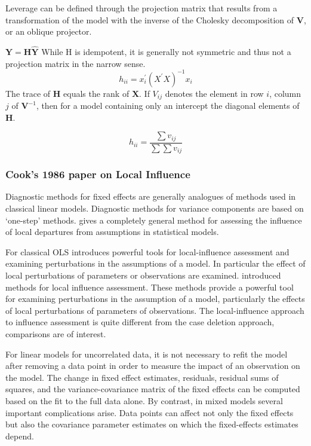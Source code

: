\documentclass[12pt, a4paper]{report}
\theoremstyle{plain}
\theoremstyle{definition}
\theoremstyle{remark}
\begin{document}
	
	Leverage can be defined through the projection matrix that results from a transformation of the model with the inverse of the Cholesky decomposition of $\boldsymbol{V}$, or an oblique projector.
	
	$\boldsymbol{Y} = \boldsymbol{H}\boldsymbol{\hat{Y}}$
	While H is idempotent, it is generally not symmetric and thus not a projection matrix in the narrow sense.
	\[ h_{ii} = x^{\prime}_{i}(X^{\prime}X)^{-1}x_{i} \]
	The trace of $\boldsymbol{H}$ equals the rank of $\boldsymbol{X}$.
	If $V_{ij}$ denotes the element in row $i$, column $j$ of $\boldsymbol{V}^{-1}$, then for a model containing only an intercept the diagonal elements of $\boldsymbol{H}$.
	
	\[ h_{ii} = \frac{\sum v_{ij}}{\sum \sum v_{ij}} \]
	
	
	
	


	\subsubsection{Cook's 1986 paper on Local Influence}%
	
	
	
	Diagnostic methods for fixed effects are generally analogues of methods used in classical linear models.
	Diagnostic methods for variance components are based on `one-step' methods. \citet{cook86} gives a completely general method for assessing the influence of local departures from assumptions in statistical models. 
	
	

		

		
	For classical OLS \citet{cook86} introduces powerful tools for local-influence assessment and examining perturbations in the assumptions of a model. In particular the effect of local perturbations of parameters or observations are examined.
			\citet{cook86} introduced methods for local influence assessment. These methods provide a powerful tool for examining perturbations in the assumption of a model, particularly the effects of local perturbations of parameters of observations. The local-influence approach to influence assessment is quite different from the case deletion approach, comparisons are of interest.

	For linear models for uncorrelated data, it is not necessary to refit the model after removing a data point in order to measure the impact of an observation on the model. The change in fixed effect estimates, residuals, residual sums of squares, and the variance-covariance matrix of the fixed effects can be computed based on the fit to the full data alone. By contrast, in mixed models several important complications arise. Data points can affect not only the fixed effects but also the covariance parameter estimates on which the fixed-effects estimates depend. 
	
\end{document}
